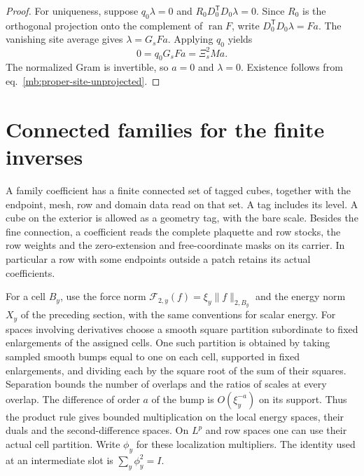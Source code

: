 \documentclass[11pt,letterpaper,reqno]{amsart}
\numberwithin{equation}{section}
\renewcommand{\eqref}[1]{\textup{eq.~\ref{#1}}}
\theoremstyle{definition}
\theoremstyle{remark}
\begin{document}
\begin{proof}
For uniqueness, suppose $q_0\lambda=0$ and
$R_0D_0^{\mathsf T}D_0\lambda=0$. Since $R_0$ is the
orthogonal projection onto the complement of $\operatorname{ran}F$,
write $D_0^{\mathsf T}D_0\lambda=Fa$. The vanishing site
average gives $\lambda=G_sFa$. Applying $q_0$ yields
\[
                0=q_0G_sFa=\Xi_s^2Ma.
\]
The normalized Gram is invertible, so $a=0$ and $\lambda=0$.
Existence follows from \eqref{mb:proper-site-unprojected}.
\end{proof}


\section{Connected families for the finite inverses}
\label{mb:sec-local-families}

A family coefficient has a finite connected set of tagged cubes, together with the endpoint, mesh, row and domain data read on that set. A tag includes its level. A cube on the exterior is allowed as a geometry tag, with the bare scale. Besides the fine connection, a coefficient reads the complete plaquette and row stocks, the row weights and the zero-extension and free-coordinate masks on its carrier. In particular a row with some endpoints outside a patch retains its actual coefficients.

For a cell \(B_y\), use the force norm \(\mathcal F_{2,y}(f)=\xi_y\|f\|_{2,B_y}\) and the energy norm \(X_y\) of the preceding section, with the same conventions for scalar energy. For spaces involving derivatives choose a smooth square partition subordinate to fixed enlargements of the assigned cells. One such partition is obtained by taking sampled smooth bumps equal to one on each cell, supported in fixed enlargements, and dividing each by the square root of the sum of their squares. Separation bounds the number of overlaps and the ratios of scales at every overlap. The difference of order \(a\) of the bump is \(O(\xi_y^{-a})\) on its support. Thus the product rule gives bounded multiplication on the local energy spaces, their duals and the second-difference spaces. On \(L^p\) and row spaces one can use their actual cell partition. Write \(\phi_y\) for these localization multipliers. The identity used at an intermediate slot is \(\sum_y\phi_y^2=I\).
\end{document}

